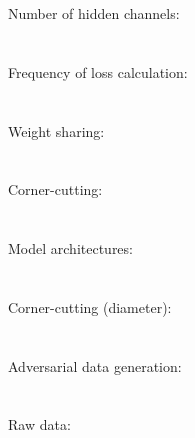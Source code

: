 \documentclass{article}
\begin{document}
Number of hidden channels:\\
\\\\

Frequency of loss calculation:\\
\\\\

Weight sharing:\\
\\\\

Corner-cutting:\\
\\\\

Model architectures:\\
\\\\

Corner-cutting (diameter):\\
\\\\

Adversarial data generation:\\
\\\\

Raw data:\\

\end{document}
